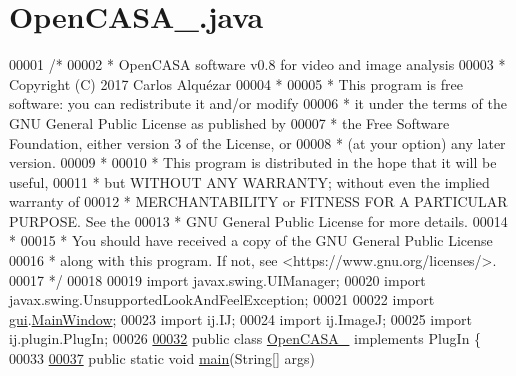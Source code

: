 \hypertarget{_open_c_a_s_a___8java_source}{}\section{Open\+C\+A\+S\+A\+\_\+.\+java}
\label{_open_c_a_s_a___8java_source}

\begin{DoxyCode}
00001 \textcolor{comment}{/*}
00002 \textcolor{comment}{ *   OpenCASA software v0.8 for video and image analysis}
00003 \textcolor{comment}{ *   Copyright (C) 2017  Carlos Alquézar}
00004 \textcolor{comment}{ *}
00005 \textcolor{comment}{ *   This program is free software: you can redistribute it and/or modify}
00006 \textcolor{comment}{ *   it under the terms of the GNU General Public License as published by}
00007 \textcolor{comment}{ *   the Free Software Foundation, either version 3 of the License, or}
00008 \textcolor{comment}{ *   (at your option) any later version.}
00009 \textcolor{comment}{ *}
00010 \textcolor{comment}{ *   This program is distributed in the hope that it will be useful,}
00011 \textcolor{comment}{ *   but WITHOUT ANY WARRANTY; without even the implied warranty of}
00012 \textcolor{comment}{ *   MERCHANTABILITY or FITNESS FOR A PARTICULAR PURPOSE.  See the}
00013 \textcolor{comment}{ *   GNU General Public License for more details.}
00014 \textcolor{comment}{ *}
00015 \textcolor{comment}{ *   You should have received a copy of the GNU General Public License}
00016 \textcolor{comment}{ *   along with this program.  If not, see <https://www.gnu.org/licenses/>.}
00017 \textcolor{comment}{*/}        
00018 
00019 \textcolor{keyword}{import} javax.swing.UIManager;
00020 \textcolor{keyword}{import} javax.swing.UnsupportedLookAndFeelException;
00021 
00022 \textcolor{keyword}{import} \hyperlink{namespacegui}{gui}.\hyperlink{classgui_1_1_main_window}{MainWindow};
00023 \textcolor{keyword}{import} ij.IJ;
00024 \textcolor{keyword}{import} ij.ImageJ;
00025 \textcolor{keyword}{import} ij.plugin.PlugIn;
00026 
\hypertarget{_open_c_a_s_a___8java_source_l00032}{}\hyperlink{class_open_c_a_s_a__}{00032} \textcolor{keyword}{public} \textcolor{keyword}{class }\hyperlink{class_open_c_a_s_a__}{OpenCASA\_} \textcolor{keyword}{implements} PlugIn \{
00033 
\hypertarget{_open_c_a_s_a___8java_source_l00037}{}\hyperlink{class_open_c_a_s_a___a8b260eecbaabcef8473fd87ada040682}{00037}   \textcolor{keyword}{public} \textcolor{keyword}{static} \textcolor{keywordtype}{void} \hyperlink{class_open_c_a_s_a___a8b260eecbaabcef8473fd87ada040682}{main}(String[] args)

\end{DoxyCode}
